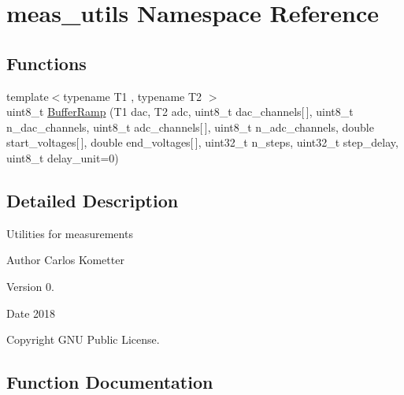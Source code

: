 \hypertarget{namespacemeas__utils}{}\section{meas\+\_\+utils Namespace Reference}
\label{namespacemeas__utils}
\subsection*{Functions}
\begin{DoxyCompactItemize}
\item 
{\footnotesize template$<$typename T1 , typename T2 $>$ }\\uint8\+\_\+t \mbox{\hyperlink{namespacemeas__utils_a48d308b4fa70e6477beb8c095f9aafb1}{Buffer\+Ramp}} (T1 dac, T2 adc, uint8\+\_\+t dac\+\_\+channels\mbox{[}$\,$\mbox{]}, uint8\+\_\+t n\+\_\+dac\+\_\+channels, uint8\+\_\+t adc\+\_\+channels\mbox{[}$\,$\mbox{]}, uint8\+\_\+t n\+\_\+adc\+\_\+channels, double start\+\_\+voltages\mbox{[}$\,$\mbox{]}, double end\+\_\+voltages\mbox{[}$\,$\mbox{]}, uint32\+\_\+t n\+\_\+steps, uint32\+\_\+t step\+\_\+delay, uint8\+\_\+t delay\+\_\+unit=0)
\end{DoxyCompactItemize}


\subsection{Detailed Description}
Utilities for measurements \begin{DoxyAuthor}{Author}
Carlos Kometter 
\end{DoxyAuthor}
\begin{DoxyVersion}{Version}
0. 
\end{DoxyVersion}
\begin{DoxyDate}{Date}
2018 
\end{DoxyDate}
\begin{DoxyCopyright}{Copyright}
G\+NU Public License. 
\end{DoxyCopyright}


\subsection{Function Documentation}
\mbox{\label{namespacemeas__utils_a48d308b4fa70e6477beb8c095f9aafb1}} 
